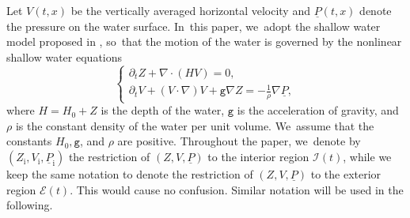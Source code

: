 \documentclass[10pt]{amsart}
\newcommand{\gr}{{\mathtt g}}
\newcommand{\dt}{\partial_t}
\newcommand{\cI}{{\mathcal I}}
\newcommand{\cE}{{\mathcal E}}
\newcommand{\ul}[1]{\underline{#1}}
\theoremstyle{definition}
\begin{document}
Let $V(t,x)$ be the vertically averaged horizontal velocity and $\ul{P}(t,x)$ denote the pressure on the water surface. In~this paper, we~adopt the shallow water model proposed in \cite{Lannes2017}, so~that the motion of the water is governed by the nonlinear shallow water equations
\begin{equation}\label{NLSWE}
\begin{cases}
\dt Z+\nabla\cdot(HV) = 0, \\
\dt V+(V\cdot\nabla)V+\gr\nabla Z = -\frac{1}{\rho}\nabla\ul{P},
\end{cases}
\end{equation}
where $H=H_0+Z$ is the depth of the water, $\gr$ is the acceleration of gravity, and $\rho$ is the constant density of the water per unit volume. We~assume that the constants $H_0, \gr$, and $\rho$ are positive.
Throughout the paper, we~denote by $(Z_\mathrm{i},V_\mathrm{i},\ul{P}_\mathrm{i})$ the restriction of $(Z,V,\ul{P})$ to the interior region $\cI(t)$,
while we keep the same notation to denote the restriction of $(Z,V,\ul{P})$ to the exterior region $\cE(t)$.
This would cause no confusion.
Similar notation will be used in the following.
\end{document}
